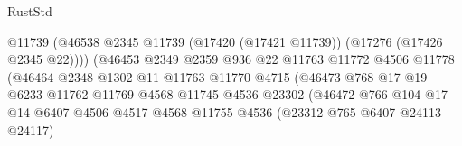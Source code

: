 \begin{lexlean}{RustStd}
\begin{coremodule}
                                                @11739
                                                (@46538
                                                  @2345
                                                  @11739
                                                  (@17420 (@17421 @11739))
                                                  (@17276 (@17426 @2345 @22))))
                                              (@46453
                                                @2349
                                                @2359
                                                @936
                                                @22
                                                @11763
                                                @11772
                                                @4506
                                                @11778
                                                (@46464
                                                  @2348
                                                  @1302
                                                  @11
                                                  @11763
                                                  @11770
                                                  @4715
                                                  (@46473
                                                    @768
                                                    @17
                                                    @19
                                                    @6233
                                                    @11762
                                                    @11769
                                                    @4568
                                                    @11745
                                                    @4536
                                                    @23302
                                                    (@46472
                                                      @766
                                                      @104
                                                      @17
                                                      @14
                                                      @6407
                                                      @4506
                                                      @4517
                                                      @4568
                                                      @11755
                                                      @4536
                                                      (@23312 @765 @6407 @24113 @24117)

\end{coremodule}
\end{lexlean}
